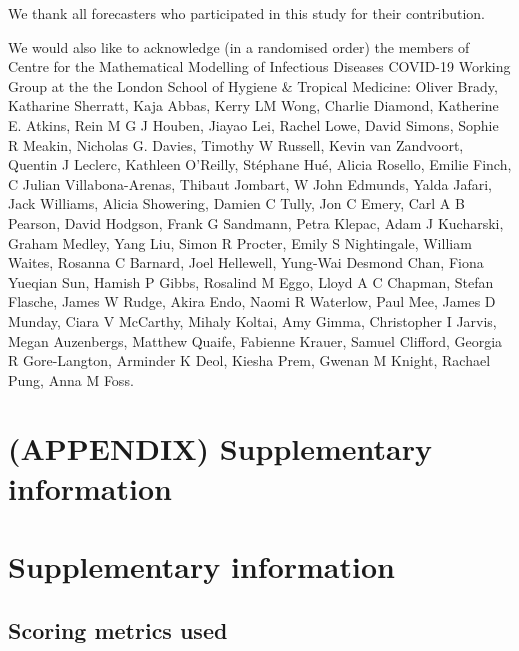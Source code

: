 \documentclass[10pt,letterpaper]{article}
\begin{document}
We thank all forecasters who participated in this study for their
contribution.

We would also like to acknowledge (in a randomised order) the members of
Centre for the Mathematical Modelling of Infectious Diseases COVID-19
Working Group at the the London School of Hygiene \& Tropical Medicine:
Oliver Brady, Katharine Sherratt, Kaja Abbas, Kerry LM Wong, Charlie
Diamond, Katherine E. Atkins, Rein M G J Houben, Jiayao Lei, Rachel
Lowe, David Simons, Sophie R Meakin, Nicholas G. Davies, Timothy W
Russell, Kevin van Zandvoort, Quentin J Leclerc, Kathleen O'Reilly,
Stéphane Hué, Alicia Rosello, Emilie Finch, C Julian Villabona-Arenas,
Thibaut Jombart, W John Edmunds, Yalda Jafari, Jack Williams, Alicia
Showering, Damien C Tully, Jon C Emery, Carl A B Pearson, David Hodgson,
Frank G Sandmann, Petra Klepac, Adam J Kucharski, Graham Medley, Yang
Liu, Simon R Procter, Emily S Nightingale, William Waites, Rosanna C
Barnard, Joel Hellewell, Yung-Wai Desmond Chan, Fiona Yueqian Sun,
Hamish P Gibbs, Rosalind M Eggo, Lloyd A C Chapman, Stefan Flasche,
James W Rudge, Akira Endo, Naomi R Waterlow, Paul Mee, James D Munday,
Ciara V McCarthy, Mihaly Koltai, Amy Gimma, Christopher I Jarvis, Megan
Auzenbergs, Matthew Quaife, Fabienne Krauer, Samuel Clifford, Georgia R
Gore-Langton, Arminder K Deol, Kiesha Prem, Gwenan M Knight, Rachael
Pung, Anna M Foss.

\clearpage

\setcounter{table}{0}  \renewcommand{\thetable}{S\arabic{table}} \setcounter{figure}{0} \renewcommand{\thefigure}{S\arabic{figure}}

\hypertarget{appendix-supplementary-information}{%
\section*{(APPENDIX) Supplementary
information}\label{appendix-supplementary-information}}

\hypertarget{supplementary-information}{%
\section{Supplementary information}\label{supplementary-information}}

\hypertarget{scoring-metrics-used}{%
\subsection{Scoring metrics used}\label{scoring-metrics-used}}
\end{document}
